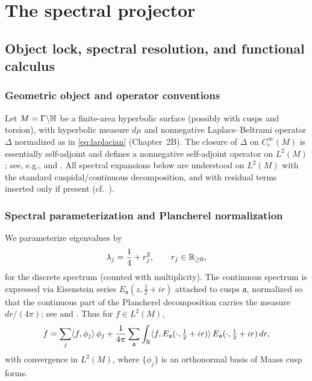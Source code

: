 
\chapter{The spectral projector}\label{ch:spectral-projector}

\section{Object lock, spectral resolution, and functional calculus}\label{sec:sp-setting}

\subsection{Geometric object and operator conventions}\label{subsec:sp-object}

Let $M=\Gamma\backslash\mathbb{H}$ be a finite-area hyperbolic surface (possibly with cusps and torsion), with
hyperbolic measure $d\mu$ and nonnegative Laplace--Beltrami operator $\Delta$ normalized as in
\eqref{eq:laplacian} (Chapter~2B). The closure of $\Delta$ on $C_c^\infty(M)$ is essentially self-adjoint and
defines a nonnegative self-adjoint operator on $L^2(M)$; see, e.g., \cite[Ch.~3]{Iwaniec2002} and \cite[Ch.~5]{Borthwick2016}.
All spectral expansions below are understood on $L^2(M)$ with the standard cuspidal/continuous decomposition,
and with residual terms inserted only if present (cf.\ \cite[Vol.~I, Ch.~6]{Hejhal1983}).

\subsection{Spectral parameterization and Plancherel normalization}\label{subsec:sp-plancherel}

We parameterize eigenvalues by
\[
\lambda_j=\frac14+r_j^2,\qquad r_j\in\mathbb{R}_{\ge 0},
\]
for the discrete spectrum (counted with multiplicity). The continuous spectrum is expressed via Eisenstein series
$E_{\mathfrak a}(z,\tfrac12+ir)$ attached to cusps $\mathfrak a$, normalized so that the continuous part of the
Plancherel decomposition carries the measure $dr/(4\pi)$; see \cite[Vol.~I, Ch.~6]{Hejhal1983} and \cite[Ch.~7]{Iwaniec2002}.
Thus for $f\in L^2(M)$,
\begin{equation}\label{eq:sp-plancherel}
f
=\sum_j \langle f,\phi_j\rangle\,\phi_j
+\frac{1}{4\pi}\sum_{\mathfrak a}\int_{\mathbb{R}}
\langle f,E_{\mathfrak a}(\cdot,\tfrac12+ir)\rangle\,E_{\mathfrak a}(\cdot,\tfrac12+ir)\,dr,
\end{equation}
with convergence in $L^2(M)$, where $\{\phi_j\}$ is an orthonormal basis of Maass cusp forms.


